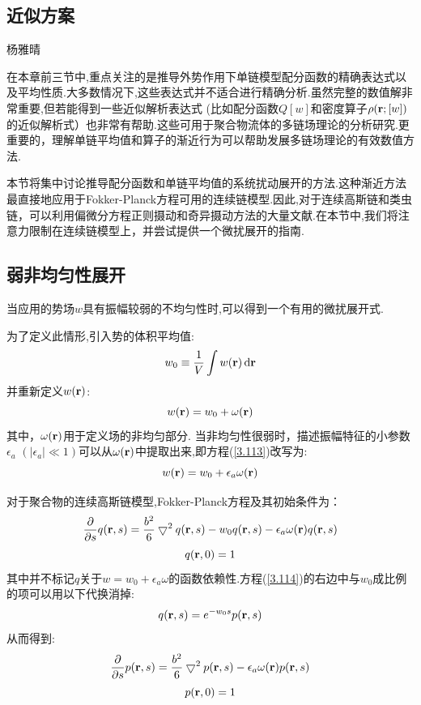 \subsection{近似方案}
{\color{red}\begin{center}
        杨雅晴
    \end{center}}

在本章前三节中,重点关注的是推导外势作用下单链模型配分函数的精确表达式以及平均性质.大多数情况下,这些表达式并不适合进行精确分析.虽然完整的数值解非常重要,但若能得到一些近似解析表达式
(比如配分函数$Q[w]$和密度算子$\rho(\mathbf{r} ;[w])$的近似解析式）也非常有帮助.这些可用于聚合物流体的多链场理论的分析研究.更重要的，理解单链平均值和算子的渐近行为可以帮助发展多链场理论的有效数值方法.

本节将集中讨论推导配分函数和单链平均值的系统扰动展开的方法.这种渐近方法最直接地应用于Fokker-Planck方程可用的连续链模型.因此,对于连续高斯链和类虫链，可以利用偏微分方程正则摄动和奇异摄动方法的大量文献.在本节中,我们将注意力限制在连续链模型上，并尝试提供一个微扰展开的指南.
\subsection{弱非均匀性展开}
当应用的势场$w$具有振幅较弱的不均匀性时,可以得到一个有用的微扰展开式.

为了定义此情形,引入势的体积平均值:
\begin{equation}
w_0\equiv \frac{1}{V} \int w(\mathbf{r} )\,\mathrm{d}\mathbf{r} 
\end{equation}
并重新定义$w(\mathbf{r} )$:
\begin{equation}
w(\mathbf{r} )=w_0+\omega(\mathbf{r} ) \label{3.113}
\end{equation}
其中，$\omega(\mathbf{r} )$用于定义场的非均匀部分.
当非均匀性很弱时，描述振幅特征的小参数$\epsilon_a$ $(|\epsilon_a| \ll 1)$可以从$\omega(\mathbf{r} )$中提取出来,即方程(\ref{3.113})改写为:
$$w(\mathbf{r} )=w_0+\epsilon_a \omega(\mathbf{r} )$$

对于聚合物的连续高斯链模型,Fokker-Planck方程及其初始条件为：
\begin{equation}
\frac{\partial}{\partial s} q(\mathbf{r} ,s) = \frac{b^2}{6} \bigtriangledown^2 q(\mathbf{r} ,s) -w_0 q(\mathbf{r} ,s) -\epsilon_a \omega(\mathbf{r} ) q(\mathbf{r} ,s) \label{3.114}
\end{equation}
\begin{equation}
q(\mathbf{r} ,0) = 1 \label{3.115}
\end{equation}
其中并不标记$q$关于$w = w_0+\epsilon_a \omega$的函数依赖性.方程(\ref{3.114})的右边中与$w_0$成比例的项可以用以下代换消掉:
\begin{equation}
q(\mathbf{r} ,s) = e^{-w_0 s} p(\mathbf{r} ,s) \label{3.116}
\end{equation}
从而得到:
\begin{equation}
\frac{\partial}{\partial s} p(\mathbf{r} ,s) = \frac{b^2}{6} \bigtriangledown^2 p(\mathbf{r} ,s) -\epsilon_a \omega(\mathbf{r} ) p(\mathbf{r} ,s) \label{3.117}
\end{equation}
\begin{equation}
p(\mathbf{r} ,0) = 1 \label{3.118}
\end{equation}

